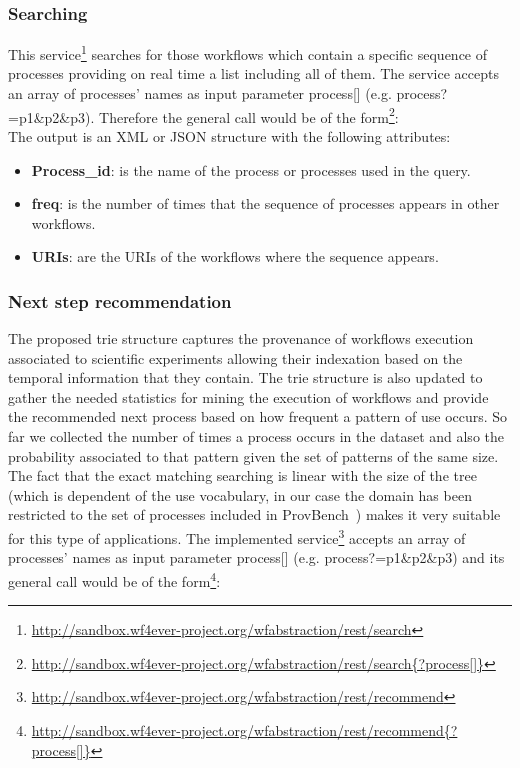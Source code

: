 \subsubsection{Searching}

This service\footnote{\url{http://sandbox.wf4ever-project.org/wfabstraction/rest/search}} searches for those workflows which contain a specific sequence of processes providing on real time a list including all of them. The service accepts an array of processes' names as input parameter process[] (e.g. process?=p1\&p2\&p3). Therefore the general call would be of the form\footnote{\url{http://sandbox.wf4ever-project.org/wfabstraction/rest/search{?process[]}}}:\\

The output is an XML or JSON structure with the following attributes: 
\begin{itemize}
\item \textbf{Process\_id}: is the name of the process or processes used in the query.
\item \textbf{freq}: is the number of times that the sequence of processes appears in other workflows.
\item \textbf{URIs}: are the URIs of the workflows where the sequence appears. 
\end{itemize}

\subsubsection{Next step recommendation}
The proposed trie structure captures the provenance of workflows execution associated to scientific experiments allowing
their indexation based on the temporal information that they contain. The trie structure is also updated to gather
the needed statistics for mining the execution of workflows and provide the recommended next process based on how frequent 
a pattern of use occurs. So far we collected the number of times a process occurs in the dataset and also the probability associated 
to that pattern given the set of patterns of the same size. The fact that the exact matching searching is linear with the size of the tree (which is dependent of the use vocabulary, in our case the domain has been restricted to the set of processes included in ProvBench~\cite{khalid_13}) makes it very suitable for 
this type of applications. The implemented service\footnote{\url{http://sandbox.wf4ever-project.org/wfabstraction/rest/recommend}} accepts an array of processes' names as input parameter process[] (e.g. process?=p1\&p2\&p3) and its general call would be of the form\footnote{\url{http://sandbox.wf4ever-project.org/wfabstraction/rest/recommend{?process[]}}}: \\

